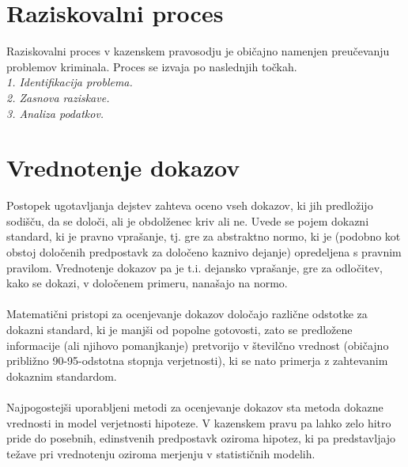 \documentclass[12pt,a4paper]{amsart}
\theoremstyle{definition} %
\theoremstyle{plain} %
\begin{document}
\section{Raziskovalni proces}
Raziskovalni proces v kazenskem pravosodju je običajno namenjen preučevanju problemov kriminala. Proces se izvaja po naslednjih točkah.\\
\textit{1. Identifikacija problema.\\} 
\textit{2. Zasnova raziskave.\\} 
\textit{3. Analiza podatkov.\\}

\section{Vrednotenje dokazov}
Postopek ugotavljanja dejstev zahteva oceno vseh dokazov, ki jih predložijo sodišču, da se določi, ali je obdolženec kriv 
ali ne. Uvede se pojem dokazni standard, ki je pravno vprašanje, tj. gre za abstraktno normo, ki je (podobno kot obstoj določenih predpostavk za 
določeno kaznivo dejanje) opredeljena s pravnim pravilom. Vrednotenje dokazov pa je t.i. dejansko vprašanje, gre za odločitev, kako se dokazi, v določenem 
primeru, nanašajo na normo. \\\\
Matematični pristopi za ocenjevanje dokazov določajo različne odstotke za dokazni standard, ki je manjši od popolne gotovosti, zato se 
predložene informacije (ali njihovo pomanjkanje) pretvorijo v številčno vrednost (običajno približno 90-95-odstotna stopnja verjetnosti), ki se nato 
primerja z zahtevanim dokaznim standardom.\\\\
Najpogostejši uporabljeni metodi za ocenjevanje dokazov sta metoda dokazne vrednosti in model verjetnosti hipoteze.
V kazenskem pravu pa lahko zelo hitro pride do posebnih, edinstvenih predpostavk oziroma hipotez, ki pa predstavljajo težave pri vrednotenju oziroma 
merjenju v statističnih modelih. 

\end{document}

